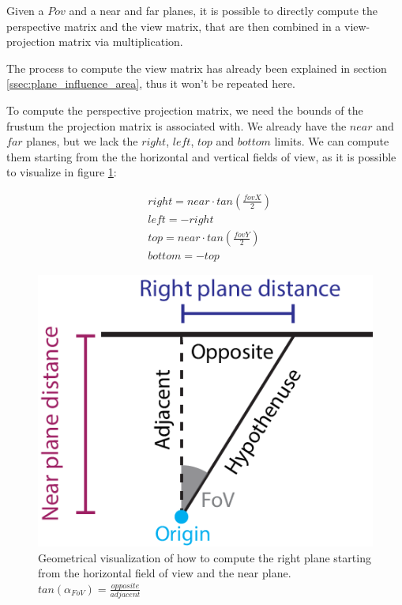 \documentclass{PoliMi_MasterThesis}
\begin{document}
Given a $Pov$ and a near and far planes, it is possible to directly compute the perspective matrix and the view matrix, that are then combined in a view-projection matrix via multiplication.

The process to compute the view matrix has already been explained in section \ref{ssec:plane_influence_area}, thus it won't be repeated here.

To compute the perspective projection matrix, we need the bounds of the frustum the projection matrix is associated with. We already have the $near$ and $far$ planes, but we lack the $right$, $left$, $top$ and $bottom$ limits. We can compute them starting from the the horizontal and vertical fields of view, as it is possible to visualize in figure \ref{fig:fov_to_right}:

\begin{align*}
	&right = near \cdot tan(\frac{fovX}{2}) \\
	&left = -right \\
	&top = near \cdot tan(\frac{fovY}{2}) \\
	&bottom = -top
\end{align*}

\begin{figure}[H]
	\centering
	\includegraphics[width=\textwidth*\real{0.3}]{Images/right_plane.png}
	\caption{Geometrical visualization of how to compute the right plane starting from the horizontal field of view and the near plane. $tan({\alpha_{FoV}}) = \frac{opposite}{adjacent}$}
	\label{fig:fov_to_right}
\end{figure}
\end{document}
